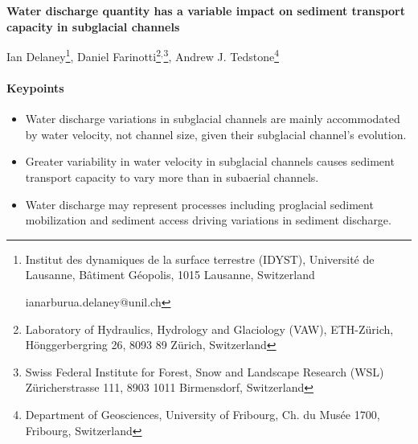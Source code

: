 \documentclass[11pt]{article}
\begin{document}
% 
% 


\begin{center}
  \Large{\textbf{Water discharge quantity has a variable impact on sediment transport capacity in subglacial channels}}
  \normalsize

  Ian Delaney\footnote{Institut des dynamiques de la surface terrestre (IDYST), Universit\'{e} de Lausanne, B\^{a}timent G\'{e}opolis, 1015 Lausanne, Switzerland 

    ianarburua.delaney@unil.ch},
  Daniel Farinotti\footnote{Laboratory of Hydraulics, Hydrology and Glaciology (VAW), ETH-Z\"urich, H\"onggerbergring 26, 8093 89 Z\"urich, Switzerland}$^{,}$\footnote{Swiss Federal Institute for Forest, Snow and Landscape Research (WSL) Z\"uricherstrasse 111, 8903 1011 Birmensdorf, Switzerland},
  Andrew J. Tedstone\footnote{Department of Geosciences, University of Fribourg, Ch. du Musée 1700, Fribourg, Switzerland}

  

\end{center}
\paragraph{Keypoints}
\begin{itemize}
\item Water discharge variations in subglacial channels are mainly accommodated by water velocity, not channel size, given their subglacial channel's evolution.

\item Greater variability in water velocity in subglacial channels causes sediment transport capacity to vary more than in subaerial channels.

\item Water discharge may represent processes including proglacial sediment mobilization and sediment access driving variations in sediment discharge.
\end{itemize}
\end{document}
